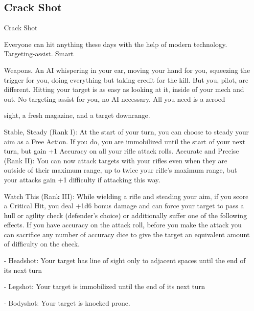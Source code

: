 \subsection{Crack Shot}

                                                   Crack Shot

Everyone can hit anything these days with the help of modern technology. Targeting-assist. Smart

Weapons. An AI whispering in your ear, moving your hand for you, squeezing the trigger for you, doing
everything but taking credit for the kill. But you, pilot, are different. Hitting your target is as easy as looking
at it, inside of your mech and out. No targeting assist for you, no AI necessary. All you need is a zeroed

sight, a fresh magazine, and a target downrange.

Stable, Steady (Rank I): At the start of your turn, you can choose to steady your aim as a Free
Action. If you do, you are immobilized until the start of your next turn, but gain +1 Accuracy on all
your rifle attack rolls.
Accurate and Precise (Rank II): You can now attack targets with your rifles even when they are
outside of their maximum range, up to twice your rifle’s maximum range, but your attacks gain
+1 difficulty if attacking this way.

Watch This (Rank III): While wielding a rifle and steading your aim, if you score a Critical Hit, you
deal +1d6 bonus damage and can force your target to pass a hull or agility check (defender’s
choice) or additionally suffer one of the following effects. If you have accuracy on the attack roll,
before you make the attack you can sacrifice any number of accuracy dice to give the target an
equivalent amount of difficulty on the check.

     -   Headshot: Your target has line of sight only to adjacent spaces until the end of its next
         turn

     -   Legshot: Your target is immobilized until the end of its next turn

     -   Bodyshot: Your target is knocked prone.
